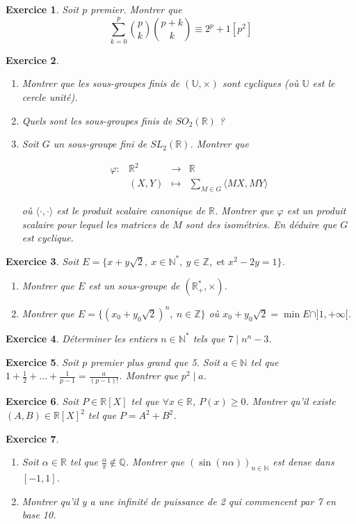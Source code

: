 \documentclass[12pt]{article}
\newtheorem{exercise}{Exercice}[section]
\theoremstyle{remark}
\theoremstyle{remark}
\newcommand{\R}{\mathbb{R}}
\newcommand{\Q}{\mathbb{Q}}
\newcommand{\N}{\mathbb{N}}
\newcommand{\Z}{\mathbb{Z}}
\newcommand{\U}{\mathbb{U}}
\newcommand{\function}[5]{
	$$
	\begin{array}{rccl}
		#1: & #2 & \to & #3 \\
		& #4 & \mapsto & #5
	\end{array}
	$$
}
\begin{document}
\begin{exercise}
	Soit $p$ premier. Montrer que
	$$\sum_{k=0}^{p}\binom{p}{k}\binom{p+k}{k}\equiv 2^{p}+1[p^{2}]$$
\end{exercise}

\begin{exercise}
	\phantom{}
	\begin{enumerate}
		\item Montrer que les sous-groupes finis de $(\U,\times)$ sont cycliques
		(où $\U$ est le cercle unité).
		\item Quels sont les sous-groupes finis de $SO_{2}(\R)$ ?
		\item Soit $G$ un sous-groupe fini de $SL_{2}(\R)$. Montrer que 
		\function{\varphi}{\R^2}{\R}{(X,Y)}{\sum_{M\in G}\langle MX,MY\rangle}
		où $\langle\cdot,\cdot\rangle$ est le produit scalaire canonique de
		$\R$. Montrer que $\varphi$ est un produit scalaire pour lequel les
		matrices de $M$ sont des isométries. En déduire que $G$ est cyclique.
	\end{enumerate}
\end{exercise}

\begin{exercise}
	Soit $E=\{x+y\sqrt{2},~x\in\N^{*},~y\in\Z,\text{ et }x^{2}-2y=1\}$.
	\begin{enumerate}
		\item Montrer que $E$ est un sous-groupe de $(\R_{+}^{*},\times)$.
		\item Montrer que $E=\{(x_{0}+y_{0}\sqrt{2})^{n},~n\in\Z\}$ où
		$x_{0}+y_{0}\sqrt{2}=\min E\cap]1,+\infty[$.
	\end{enumerate}
\end{exercise}

\begin{exercise}
	Déterminer les entiers $n\in\N^{*}$ tels que $7\mid n^{n}-3$.
\end{exercise}

\begin{exercise}
	Soit $p$ premier plus grand que 5. Soit $a\in\N$ tel que
	$1+\frac{1}{2}+\dots+\frac{1}{p-1}=\frac{a}{(p-1)!}$.
	Montrer que $p^{2}\mid a$.
\end{exercise}

\begin{exercise}
	Soit $P\in \R[X]$ tel que $\forall x\in\R$, $P(x)\geqslant0$. Montrer qu'il
	existe $(A,B)\in\R[X]^{2}$ tel que $P=A^{2}+B^{2}$.
\end{exercise}

\begin{exercise}
	\phantom{}
	\begin{enumerate}
		\item Soit $\alpha\in\R$ tel que $\frac{\alpha}{\pi}\notin\Q$. Montrer que
		$(\sin(n\alpha))_{n\in\N}$ est dense dans $[-1,1]$.
		\item Montrer qu'il y a une infinité de puissance de 2 qui commencent
		par 7 en base 10.
	\end{enumerate}
\end{exercise}
\end{document}
